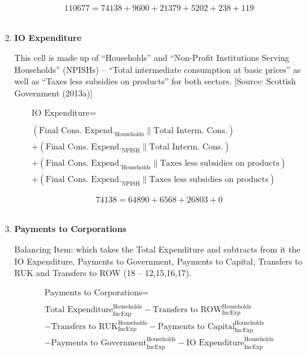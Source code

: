 \begin{enumerate}
\begin{equation} \nonumber
110677 = 74138+9600+21379+5202+238+119
\end{equation}\\


\item \textbf {IO Expenditure}

This cell is made up of “Households” and “Non-Profit Institutions Serving Households” (NPISHs) – “Total intermediate consumption at basic prices” as well as “Taxes less subsidies on products” for both sectors. [Source: Scottish Government (2013a)]

\begin{equation}
\begin{split}
\text{IO Expenditure} =  \\ \\
(\text{Final Cons. Expend.}_\text{Households}\|\text{Total Interm. Cons.})\\
+(\text{Final Cons. Expend.}_\text{NPISH}\|\text{Total Interm. Cons.})\\
+(\text{Final Cons. Expend.}_\text{Households}\|\text{Taxes less subsidies on products})\\
+(\text{Final Cons. Expend.}_\text{NPISH}\|\text{Taxes less subsidies on products})
\end{split} \label{eq:2.5.15}
\end{equation}

\begin{equation} \nonumber
74138 = 64890+6568+26803+0
\end{equation}\\


\item \textbf {Payments to Corporations}

Balancing Item: which takes the Total Expenditure and subtracts from it the IO Expenditure, Payments to Government, Payments to Capital, Transfers to RUK and Transfers to ROW (18 – 12,15,16,17).

\begin{equation}
\begin{split}
\text{Payments to Corporations} =  \\ \\
\text{Total Expenditure}^\text{Households}_\text{IncExp}-\text{Transfers to ROW}^\text{Households}_\text{IncExp}\\
-\text{Transfers to RUK}^\text{Households}_\text{IncExp}-\text{Payments to Capital}^\text{Households}_\text{IncExp}\\
-\text{Payments to Government}^\text{Households}_\text{IncExp}-\text{IO Expenditure}^\text{Households}_\text{IncExp}
\end{split} \label{eq:2.5.16}
\end{equation}


\end{enumerate}
